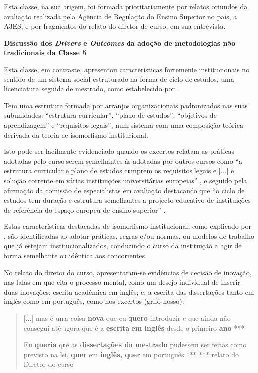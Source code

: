 \documentclass{textolivre}
\begin{document}
Esta classe, na sua origem, foi formada prioritariamente por relatos oriundos da avaliação realizada pela Agência de Regulação do Ensino Superior no país, a A3ES, e por fragmentos do relato do diretor de curso, em sua entrevista.

\textbf{Discussão dos \textit{Drivers} e \textit{Outcomes} da adoção de metodologias não tradicionais da Classe 5}

Esta classe, em contraste, apresentou características fortemente institucionais no sentido de um sistema social estruturado na forma de ciclo de estudos, uma licenciatura seguida de mestrado, como estabelecido por \textcite{rogers1983}.

Tem uma estrutura formada por arranjos organizacionais padronizados nas suas subunidades: “estrutura curricular”, “plano de estudos”, “objetivos de aprendizagem” e “requisitos legais”, num sistema com uma composição teórica derivada da teoria de isomorfismo institucional.

Isto pode ser facilmente evidenciado quando os excertos relatam as práticas adotadas pelo curso serem semelhantes às adotadas por outros cursos como “a estrutura curricular e plano de estudos cumprem os requisitos legais e [...] é solução corrente em várias instituições universitárias europeias” \cite{A3ES2015a}, e seguido pela afirmação da comissão de especialistas em avaliação destacando que “o ciclo de estudos tem duração e estrutura semelhantes a projecto educativo de instituições de referência do espaço europeu de ensino superior” \cite{A3ES2015b}.   

Estas características destacadas de isomorfismo institucional, como explicado por \textcite{dimaggio1983}, são identificadas ao adotar práticas, regras e/ou normas, ou modelos de trabalho que já estejam institucionalizados, conduzindo o curso da instituição a agir de forma semelhante ou idêntica aos concorrentes.

No relato do diretor do curso, apresentaram-se evidências de decisão de inovação, nas falas em que cita o processo mental, como um desejo individual de inserir duas inovações:  escrita académica em inglês; e, a escrita das dissertações tanto em inglês como em português, como nos excertos (grifo nosso):

\begin{quote}
[...] mas é uma coisa \textbf{nova} que eu \textbf{quero} introduzir e que ainda não consegui até agora que é a \textbf{escrita em inglês} desde o primeiro \textbf{ano} ***

Eu \textbf{queria} que as \textbf{dissertações do mestrado} pudessem ser feitas como previsto na lei, \textbf{quer} em \textbf{inglês, quer} em português ***
*** relato do Diretor do curso
\end{quote}
\end{document}
